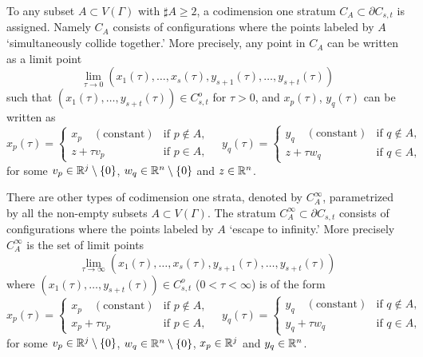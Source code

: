 To any subset $A \subset V(\Gamma )$ with $\sharp A \ge 2$, a codimension one stratum $C_A \subset \partial C_{s,t}$
is assigned.
Namely $C_A$ consists of configurations where the points labeled by $A$ `simultaneously collide together.'
More precisely, any point in $C_A$ can be written as a limit point
\begin{equation}\label{first_limit}
 \lim_{\tau \to 0} (x_1 (\tau ),\dots ,x_s (\tau ),y_{s+1} (\tau ),\dots ,y_{s+t} (\tau ))
\end{equation}
such that $(x_1 (\tau ),\dots ,y_{s+t} (\tau )) \in C^o_{s,t}$ for $\tau >0$, and $x_p (\tau )$, $y_q (\tau )$ can be
written as
\[
 x_p (\tau ) =
 \begin{cases}
  x_p \quad (\text{constant}) & \text{if } p \not\in A, \\
  z + \tau v_p & \text{if } p \in A,
 \end{cases}\quad
 y_q (\tau ) =
 \begin{cases}
  y_q \quad (\text{constant}) & \text{if } q \not\in A, \\
  z + \tau w_q & \text{if } q \in A,
 \end{cases}
\]
for some $v_p \in \mathbb{R}^j \setminus \{ 0\}$, $w_q \in \mathbb{R}^n \setminus \{ 0\}$ and $z \in \mathbb{R}^n$.


There are other types of codimension one strata, denoted by $C^{\infty}_A$, parametrized by all the
non-empty subsets $A \subset V(\Gamma )$.
The stratum $C^{\infty}_A \subset \partial C_{s,t}$ consists of configurations where the points labeled by $A$
`escape to infinity.'
More precisely $C^{\infty}_A$ is the set of limit points
\begin{equation}\label{infty_limit}
 \lim_{\tau \to \infty} (x_1 (\tau ),\dots ,x_s (\tau ),y_{s+1} (\tau ),\dots ,y_{s+t} (\tau ))
\end{equation}
where $(x_1 (\tau ),\dots ,y_{s+t} (\tau )) \in C^o_{s,t}$ ($0 <\tau <\infty$) is of the form
\[
 x_p (\tau ) =
 \begin{cases}
  x_p \quad (\text{constant}) & \text{if } p \not\in A, \\
  x_p + \tau v_p              & \text{if } p \in A,
 \end{cases}\quad
 y_q (\tau ) =
 \begin{cases}
  y_q \quad (\text{constant}) & \text{if } q \not\in A, \\
  y_q + \tau w_q              & \text{if } q \in A,
 \end{cases}
\]
for some $v_p \in \mathbb{R}^j \setminus \{ 0\}$, $w_q \in \mathbb{R}^n \setminus \{ 0\}$, $x_p \in \mathbb{R}^j$ and $y_q \in \mathbb{R}^n$.


